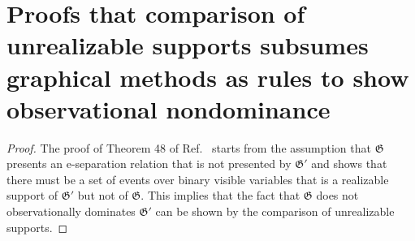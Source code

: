 \section{Proofs that comparison of unrealizable supports subsumes graphical methods as rules to show observational nondominance}
\label{appendix_proofs_subsume}


\esep*
\begin{proof}
	The proof of  Theorem 48 of Ref.~\cite{Khanna_2023} starts from the assumption that $\mathfrak{G}$ presents an e-separation relation that is not presented by $\mathfrak{G}'$ and shows that there must be a set of events over binary visible variables that is a realizable support of $\mathfrak{G}'$ but not of $\mathfrak{G}$. This implies that the fact that  $\mathfrak{G}$ does not observationally dominates $\mathfrak{G}'$ can be shown by the comparison of unrealizable supports. 
\end{proof}


